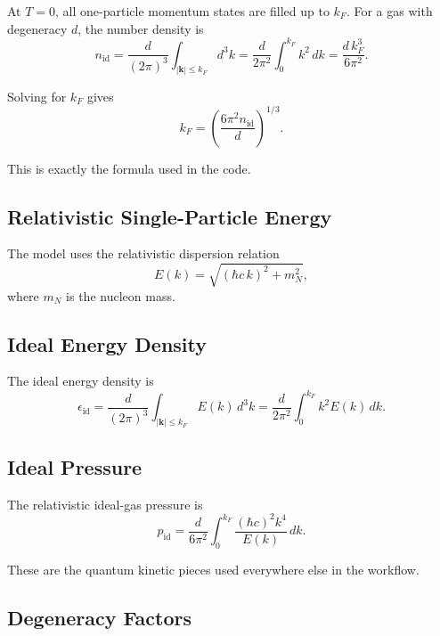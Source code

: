 \documentclass[11pt]{article}
\begin{document}
At $T=0$, all one-particle momentum states are filled up to $k_F$. For a gas
with degeneracy $d$, the number density is
\begin{equation}
n_{\mathrm{id}}
=
\frac{d}{(2\pi)^3}\int_{|\mathbf{k}|\le k_F} d^3k
=
\frac{d}{2\pi^2}\int_0^{k_F} k^2\,dk
=
\frac{d\,k_F^3}{6\pi^2}.
\end{equation}

Solving for $k_F$ gives
\begin{equation}
k_F
=
\left(\frac{6\pi^2 n_{\mathrm{id}}}{d}\right)^{1/3}.
\end{equation}

This is exactly the formula used in the code.

\subsection{Relativistic Single-Particle Energy}

The model uses the relativistic dispersion relation
\begin{equation}
E(k)=\sqrt{(\hbar c\,k)^2+m_N^2},
\end{equation}
where $m_N$ is the nucleon mass.

\subsection{Ideal Energy Density}

The ideal energy density is
\begin{equation}
\epsilon_{\mathrm{id}}
=
\frac{d}{(2\pi)^3}\int_{|\mathbf{k}|\le k_F} E(k)\,d^3k
=
\frac{d}{2\pi^2}\int_0^{k_F} k^2 E(k)\,dk.
\end{equation}

\subsection{Ideal Pressure}

The relativistic ideal-gas pressure is
\begin{equation}
p_{\mathrm{id}}
=
\frac{d}{6\pi^2}\int_0^{k_F}\frac{(\hbar c)^2 k^4}{E(k)}\,dk.
\end{equation}

These are the quantum kinetic pieces used everywhere else in the workflow.

\subsection{Degeneracy Factors}
\end{document}
